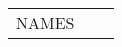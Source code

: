 \documentclass[a4paper, 12pt]{scrartcl}
\begin{document}
\def\arraystretch{1.5}
\begin{longtable}{m{}|m{}|m{}}
NAMES
\end{longtable}
\end{document}
